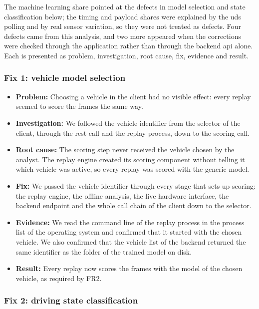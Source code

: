 The machine learning share pointed at the defects in model selection and state classification below; the timing and payload shares were explained by the \gls{uds} polling and by real sensor variation, so they were not treated as defects. Four defects came from this analysis, and two more appeared when the corrections were checked through the application rather than through the backend \gls{api} alone. Each is presented as problem, investigation, root cause, fix, evidence and result.

\subsubsection{Fix 1: vehicle model selection}

\begin{itemize}
    \item \textbf{Problem:} Choosing a vehicle in the client had no visible effect: every replay seemed to score the frames the same way.
    \item \textbf{Investigation:} We followed the vehicle identifier from the selector of the client, through the \gls{rest} call and the replay process, down to the scoring call.
    \item \textbf{Root cause:} The scoring step never received the vehicle chosen by the analyst. The replay engine created its scoring component without telling it which vehicle was active, so every replay was scored with the generic model.
    \item \textbf{Fix:} We passed the vehicle identifier through every stage that sets up scoring: the replay engine, the offline analysis, the live hardware interface, the backend endpoint and the whole call chain of the client down to the selector.
    \item \textbf{Evidence:} We read the command line of the replay process in the process list of the operating system and confirmed that it started with the chosen vehicle. We also confirmed that the vehicle list of the backend returned the same identifier as the folder of the trained model on disk.
    \item \textbf{Result:} Every replay now scores the frames with the model of the chosen vehicle, as required by FR2.
\end{itemize}

\subsubsection{Fix 2: driving state classification}
\label{sec:fix2}

